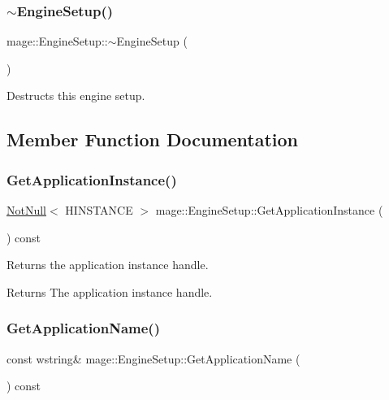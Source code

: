 \subsubsection{\texorpdfstring{$\sim$\+Engine\+Setup()}{~EngineSetup()}}
{\footnotesize\ttfamily mage\+::\+Engine\+Setup\+::$\sim$\+Engine\+Setup (\begin{DoxyParamCaption}{ }\end{DoxyParamCaption})\hspace{0.3cm}{\ttfamily [default]}}

Destructs this engine setup. 

\subsection{Member Function Documentation}
\mbox{\label{classmage_1_1_engine_setup_a278a3df908b5b369a597812de4010532}} 
\subsubsection{\texorpdfstring{Get\+Application\+Instance()}{GetApplicationInstance()}}
{\footnotesize\ttfamily \mbox{\hyperlink{namespacemage_a8769f9d670d6b585ea306cb1062af94b}{Not\+Null}}$<$ H\+I\+N\+S\+T\+A\+N\+CE $>$ mage\+::\+Engine\+Setup\+::\+Get\+Application\+Instance (\begin{DoxyParamCaption}{ }\end{DoxyParamCaption}) const\hspace{0.3cm}{\ttfamily [noexcept]}}

Returns the application instance handle.

\begin{DoxyReturn}{Returns}
The application instance handle. 
\end{DoxyReturn}
\mbox{\label{classmage_1_1_engine_setup_ab79015dba68069256ed42595b30a5728}} 
\subsubsection{\texorpdfstring{Get\+Application\+Name()}{GetApplicationName()}}
{\footnotesize\ttfamily const wstring\& mage\+::\+Engine\+Setup\+::\+Get\+Application\+Name (\begin{DoxyParamCaption}{ }\end{DoxyParamCaption}) const\hspace{0.3cm}{\ttfamily [noexcept]}}

